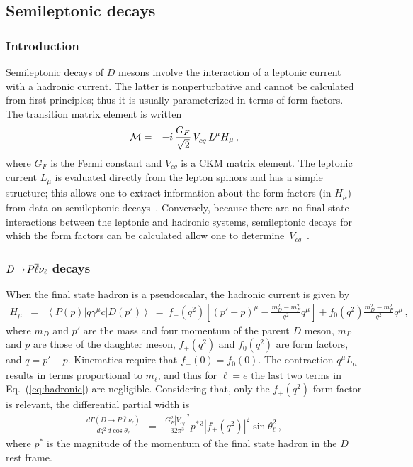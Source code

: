 \subsection{Semileptonic decays}
\label{sec:charm:semileptonic}

\subsubsection{Introduction}

Semileptonic decays of $D$ mesons involve the interaction of a leptonic
current with a hadronic current. The latter is nonperturbative
and cannot be calculated from first principles; thus it is usually
parameterized in terms of form factors. The transition matrix element 
is written
\begin{eqnarray}
  {\cal M} & = & -i\,\frac{G_F}{\sqrt{2}}\,V^{}_{cq}\,L^\mu H_\mu\,,
  \label{Melem}
\end{eqnarray}
where $G_F$ is the Fermi constant and $V^{}_{cq}$ is a CKM matrix element.
The leptonic current $L_\mu$ is evaluated directly from the lepton spinors 
and has a simple structure; this allows one to extract information about 
the form factors (in $H^{}_\mu$) from data on semileptonic decays~\cite{Becher:2005bg}.  
Conversely, because there are no final-state interactions between the
leptonic and hadronic systems, semileptonic decays for which the form 
factors can be calculated allow one to 
determine~$V^{}_{cq}$~\cite{Kobayashi:1973fv}.

\subsubsection{$D\!\rightarrow\! P \overline \ell \nu_{\ell}$ decays}

When the final state hadron is a pseudoscalar, the hadronic 
current is given by
\begin{eqnarray}
H_\mu & = & \left< P(p) | \bar{q}\gamma^\mu c | D(p') \right> \ =\  
f_+(q^2)\left[ (p' + p)^\mu -\frac{m_D^2-m_P^2}{q^2}q^\mu\right] + 
 f_0(q^2)\frac{m_D^2-m_P^2}{q^2}q^\mu\,,
\label{eq:hadronic}
\end{eqnarray}
where $m_D$ and $p'$ are the mass and four momentum of the 
parent $D$ meson, $m_P$ and $p$ are those of the daughter meson, 
$f_+(q^2)$ and $f_0(q^2)$ are form factors, and $q = p' - p$.  
Kinematics require that $f_+(0) = f_0(0)$.
The contraction $q^\mu L_\mu$ results in terms proportional 
to $m^{}_\ell$\cite{Gilman:1989uy}, and thus for $\ell=e $
the last two terms in Eq.~(\ref{eq:hadronic}) are negligible. 
Considering that, only the $f_+(q^2)$ form factor 
is relevant, the differential partial width is
\begin{eqnarray}
\frac{d\Gamma(D \to P \bar \ell \nu_\ell)}{dq^2\, d\cos\theta_\ell} & = & 
   \frac{G_F^2|V_{cq}|^2}{32\pi^3} p^{*\,3}|f_{+}(q^2)|^2\sin\theta^2_\ell\,,
\label{eq:dGamma}
\end{eqnarray}
where ${p^*}$ is the magnitude of the momentum of the final state hadron
in the $D$ rest frame.

